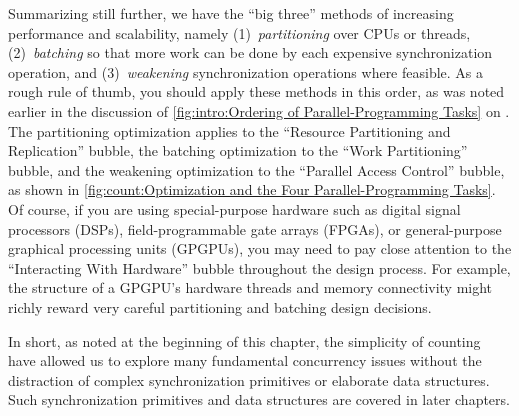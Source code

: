 Summarizing still further, we have the ``big three'' methods of
increasing performance and scalability, namely
(1)~\emph{partitioning} over CPUs or threads,
(2)~\emph{batching} so that more work can be done by each expensive
synchronization operation, and
(3)~\emph{weakening} synchronization operations where feasible.
As a rough rule of thumb, you should apply these methods in this order,
as was noted earlier in the discussion of
\cref{fig:intro:Ordering of Parallel-Programming Tasks}
on
.
The partitioning optimization applies to the
``Resource Partitioning and Replication'' bubble,
the batching optimization to the ``Work Partitioning'' bubble,
and the weakening optimization to the ``Parallel Access Control'' bubble,
as shown in
\cref{fig:count:Optimization and the Four Parallel-Programming Tasks}.
Of course, if you are using special-purpose hardware such as
digital signal processors (DSPs), field-programmable gate arrays (FPGAs),
or general-purpose graphical processing units (GPGPUs), you may need
to pay close attention to the ``Interacting With Hardware'' bubble
throughout the design process.
For example, the structure of a GPGPU's hardware threads and memory
connectivity might richly reward very careful partitioning
and batching design decisions.

In short, as noted at the beginning of this chapter, the simplicity
of counting have allowed us to explore many
fundamental concurrency issues without the distraction of
complex synchronization primitives or elaborate data structures.
Such synchronization primitives and data structures are covered
in later chapters.

